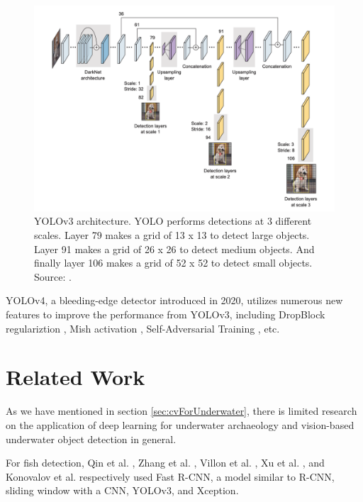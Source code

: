 \documentclass[a4paper, 11pt, oneside]{article}
\begin{document}
  \begin{figure}[ht]
    \begin{center}
      \includegraphics[width=\textwidth]{yolov3.png}
    \end{center}
    \caption{YOLOv3 architecture. YOLO performs detections at 3 different scales. Layer 79 makes a grid of 13 x 13 to
    detect large objects. Layer 91 makes a grid of 26 x 26 to detect medium objects. And finally layer 106 makes a grid
    of 52 x 52 to detect small objects. Source: \cite{elgendy2020deep}.}
  \end{figure}

  YOLOv4, a bleeding-edge detector introduced in 2020, utilizes numerous new features to improve the performance
  from YOLOv3, including DropBlock regulariztion \cite{ghiasi2018dropblock}, Mish activation \cite{misra2019mish},
  Self-Adversarial Training \cite{bochkovskiy2020yolov4}, etc.

  \section{Related Work}

  As we have mentioned in section \ref{sec:cvForUnderwater}, there is limited research on the application of deep learning
  for underwater archaeology and vision-based underwater object detection in general.

  For fish detection, Qin et al. \cite{qin2015underwater, li2015fast}, Zhang et al. \cite{zhang2016unsupervised},
  Villon et al. \cite{villon2016coral}, Xu et al. \cite{xu2018underwater}, and Konovalov et al.
  \cite{konovalov2019underwater} respectively used Fast R-CNN, a model similar to R-CNN, sliding window with a CNN,
  YOLOv3, and Xception.
\end{document}

